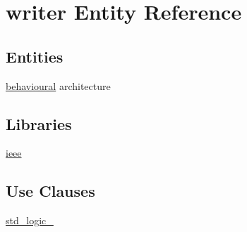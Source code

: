 \hypertarget{classwriter}{}\section{writer Entity Reference}
\label{classwriter}
\subsection*{Entities}
\begin{DoxyCompactItemize}
\item 
\hyperlink{classwriter_1_1behavioural}{behavioural} architecture
\end{DoxyCompactItemize}
\subsection*{Libraries}
 \begin{DoxyCompactItemize}
\item 
\mbox{\label{classwriter_a0a6af6eef40212dbaf130d57ce711256}} 
\hyperlink{classwriter_a0a6af6eef40212dbaf130d57ce711256}{ieee} 
\end{DoxyCompactItemize}
\subsection*{Use Clauses}
 \begin{DoxyCompactItemize}
\item 
\mbox{\label{classwriter_acd03516902501cd1c7296a98e22c6fcb}} 
\hyperlink{classwriter_acd03516902501cd1c7296a98e22c6fcb}{std\+\_\+logic\+\_}   
\end{DoxyCompactItemize}
